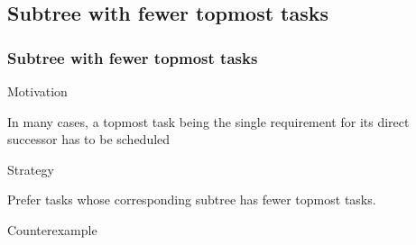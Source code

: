 \documentclass{beamer}
\newenvironment{strategyblock}
{
  \begin{block}{Strategy}
}
{
  \end{block}
}
\newenvironment{motivationblock}
{
  \begin{block}{Motivation}
}
{
  \end{block}
}
\newenvironment{counterexampleblock}
{
  \begin{alertblock}{Counterexample}
}
{
  \end{alertblock}
}
\newcommand{\todo}[1]{ {\color{red}{#1} }}
\begin{document}

\subsection{Subtree with fewer topmost tasks}

\begin{frame}
  \frametitle{Subtree with fewer topmost tasks}
  \begin{motivationblock}
    In many cases, a topmost task being the single requirement for its direct successor has to be scheduled
  \end{motivationblock}
  \begin{strategyblock}
    Prefer tasks whose corresponding subtree has fewer topmost tasks.
  \end{strategyblock}
  \begin{counterexampleblock}
    \begin{center}
      
      \quad
      
    \end{center}
  \end{counterexampleblock}  
\end{frame}


\end{document}
